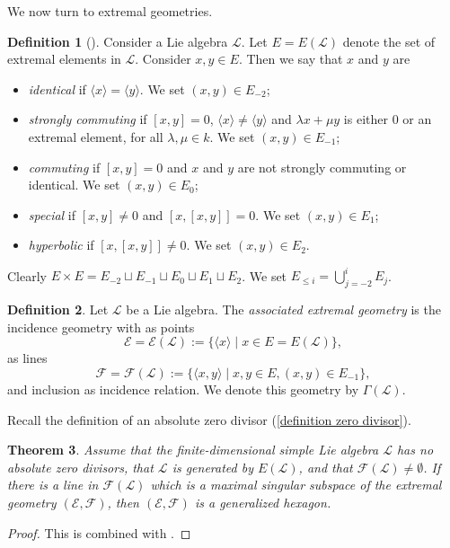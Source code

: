 \documentclass[oneside,a4paper]{amsart} %
\newtheorem{theorem}{Theorem}[section]
\theoremstyle{definition}
\newtheorem{definition}[theorem]{Definition}
\newcommand{\LL}{\mathcal{L}}
\newcommand{\E}{\mathcal{E}}
\newcommand{\F}{\mathcal{F}}
\numberwithin{equation}{section}
\begin{document}
We now turn to extremal geometries.

\begin{definition}[{\cite[p.\@~435]{Cohen2006}}]\label{E_i}
	Consider a Lie algebra $\LL$. Let $E=E(\LL)$ denote the set of extremal elements in $\LL$. Consider $x,y\in E$. Then we say that $x$ and $y$ are
	\begin{itemize}
		\item \textit{identical} if $\langle x\rangle=\langle y\rangle$. We set $(x,y)\in E_{-2}$;
		\item \textit{strongly commuting} if $[x,y]=0$, $\langle x\rangle\neq \langle y\rangle$ and $\lambda x+\mu y$ is either $0$ or an extremal element, for all $\lambda, \mu\in k$. We set $(x,y)\in E_{-1}$;
		\item \textit{commuting} if $[x,y]=0$ and $x$ and $y$ are not strongly commuting or identical. We set $(x,y)\in E_{0}$;
		\item \textit{special} if $[x,y]\neq 0$ and $[x,[x,y]]=0$. We set $(x,y)\in E_{1}$;
		\item \textit{hyperbolic} if $[x,[x,y]]\neq 0$. We set $(x,y)\in E_{2}$.
	\end{itemize}
	Clearly $E\times E=E_{-2}\sqcup E_{-1}\sqcup E_{0}\sqcup E_{1}\sqcup E_{2}$. We set $E_{\leq i}=\bigcup\limits_{j=-2}^{i} E_j$.
\end{definition}

\begin{definition}\label{extremal geometry}
	Let $\LL$ be a Lie algebra. The \textit{associated extremal geometry} is the incidence geometry with as points 
	\[ \E=\E(\LL):=\{\langle x\rangle \mid x\in E=E(\LL)\},\]
	as lines 
	\[ \F=\F(\LL):=\{ \langle x,y\rangle\mid x,y\in E, (x,y)\in E_{-1}\}, \]
	and inclusion as incidence relation.
	We denote this geometry by $\Gamma(\LL)$.
\end{definition}

Recall the definition of an absolute zero divisor (\cref{definition zero divisor}).

\begin{theorem}
\label{Extremal geometry characterisation hexagon}	
	Assume that the finite-dimensional simple Lie algebra $\LL$ has no absolute zero divisors, that $\LL$ is generated by $E(\LL)$, and that $\F(\LL)\neq\emptyset$. If there is a line in $\F(\LL)$ which is a maximal singular subspace of the extremal geometry $(\E,\F)$, then $(\E,\F)$ is a generalized hexagon. 
\end{theorem}
\begin{proof}
	This is \cite[Corollary 18]{Cohen2007} combined with \cite[Theorem 28(ii)]{Cohen2006}.
\end{proof}
\end{document}
